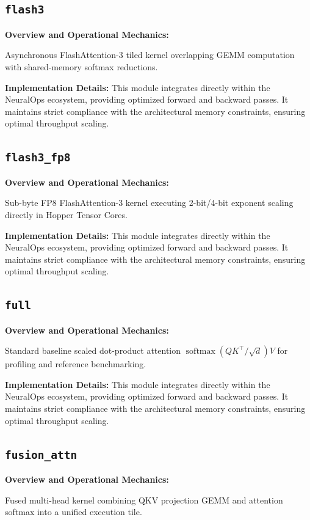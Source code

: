 \documentclass[10pt,twocolumn,letterpaper]{article}
\begin{document}
\subsection{\texttt{flash3}}
\textbf{Overview and Operational Mechanics:}

Asynchronous FlashAttention-3 tiled kernel overlapping GEMM computation with shared-memory softmax reductions.

\textbf{Implementation Details:}
This module integrates directly within the NeuralOps ecosystem, providing optimized forward and backward passes. It maintains strict compliance with the architectural memory constraints, ensuring optimal throughput scaling.

\subsection{\texttt{flash3\_fp8}}
\textbf{Overview and Operational Mechanics:}

Sub-byte FP8 FlashAttention-3 kernel executing 2-bit/4-bit exponent scaling directly in Hopper Tensor Cores.

\textbf{Implementation Details:}
This module integrates directly within the NeuralOps ecosystem, providing optimized forward and backward passes. It maintains strict compliance with the architectural memory constraints, ensuring optimal throughput scaling.

\subsection{\texttt{full}}
\textbf{Overview and Operational Mechanics:}

Standard baseline scaled dot-product attention $\operatorname{softmax}(Q K^\top / \sqrt{d}) V$ for profiling and reference benchmarking.

\textbf{Implementation Details:}
This module integrates directly within the NeuralOps ecosystem, providing optimized forward and backward passes. It maintains strict compliance with the architectural memory constraints, ensuring optimal throughput scaling.

\subsection{\texttt{fusion\_attn}}
\textbf{Overview and Operational Mechanics:}

Fused multi-head kernel combining QKV projection GEMM and attention softmax into a unified execution tile.
\end{document}

